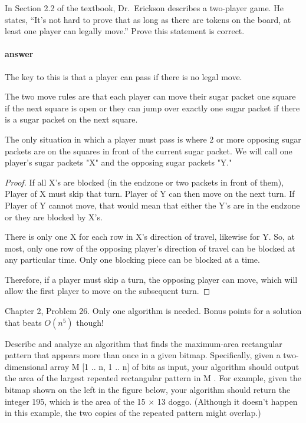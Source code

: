 \documentclass{article}
\begin{document}
In Section 2.2 of the textbook, Dr.~Erickson describes a two-player game.
He states, ``It's not hard to prove that
as long as there are tokens on the board, at least one player can legally
move.''  Prove this statement is correct.

\paragraph{answer}
The key to this is that a player can pass if there is no legal move.

The two move rules are that each player can move their sugar packet one square if the next
square is open or they can jump over exactly one sugar packet if there is a sugar packet on
the next square.

The only situation in which a player must pass is where 2 or more opposing sugar packets are on the
squares in front of the current sugar packet. We will call one player's sugar packets "X" and the opposing
sugar packets "Y."

\begin{proof}
    If all X's are blocked (in the endzone or two packets in front of them), Player of X must skip that turn.
    Player of Y can then move on the next turn. If Player of Y cannot move, that would mean that
    either the Y's are in the endzone or they are blocked by X's.

    There is only one X for each row in X's direction of travel, likewise for Y. So, at most, only
    one row of the opposing player's direction of travel can be blocked at any particular time.
    Only one blocking piece can be blocked at a time.

    Therefore, if a player must skip a turn, the opposing player can move, which will allow the first
    player to move on the subsequent turn.
\end{proof}



\collab{}

Chapter 2, Problem 26.  Only one algorithm is needed.  Bonus points for a
solution that beats $O(n^5)$ though!

Describe and analyze an algorithm that finds the maximum-area rectangular
pattern that appears more than once in a given bitmap. Specifically, given
a two-dimensional array M [1 .. n, 1 .. n] of bits as input, your algorithm
should output the area of the largest repeated rectangular pattern in M .
For example, given the bitmap shown on the left in the figure below, your
algorithm should return the integer 195, which is the area of the 15 × 13
doggo. (Although it doesn’t happen in this example, the two copies of the
repeated pattern might overlap.)
\end{document}
